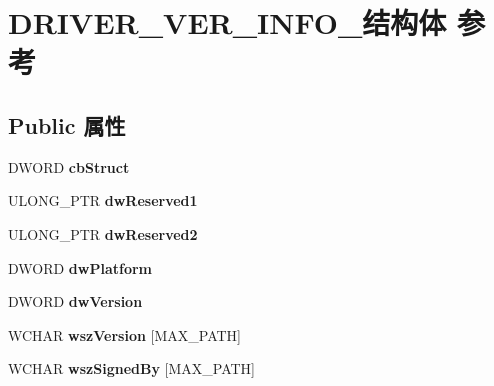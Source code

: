 \hypertarget{struct_d_r_i_v_e_r___v_e_r___i_n_f_o__}{}\section{D\+R\+I\+V\+E\+R\+\_\+\+V\+E\+R\+\_\+\+I\+N\+F\+O\+\_\+结构体 参考}
\label{struct_d_r_i_v_e_r___v_e_r___i_n_f_o__}
\subsection*{Public 属性}
\begin{DoxyCompactItemize}
\item 
\mbox{\label{struct_d_r_i_v_e_r___v_e_r___i_n_f_o___aa079c5b69594cfdfcebdfc1f5f7913ef}} 
D\+W\+O\+RD {\bfseries cb\+Struct}
\item 
\mbox{\label{struct_d_r_i_v_e_r___v_e_r___i_n_f_o___aeef7397969221ad24ec986f1e923f425}} 
U\+L\+O\+N\+G\+\_\+\+P\+TR {\bfseries dw\+Reserved1}
\item 
\mbox{\label{struct_d_r_i_v_e_r___v_e_r___i_n_f_o___ae4bb239cd33a9e55286fac3bfc927ced}} 
U\+L\+O\+N\+G\+\_\+\+P\+TR {\bfseries dw\+Reserved2}
\item 
\mbox{\label{struct_d_r_i_v_e_r___v_e_r___i_n_f_o___a36c6128f252b04102b562a3428f143df}} 
D\+W\+O\+RD {\bfseries dw\+Platform}
\item 
\mbox{\label{struct_d_r_i_v_e_r___v_e_r___i_n_f_o___a81900287ff21433bf01c8bf58786ca1c}} 
D\+W\+O\+RD {\bfseries dw\+Version}
\item 
\mbox{\label{struct_d_r_i_v_e_r___v_e_r___i_n_f_o___a6a3150c9206123850c368c2a79eea200}} 
W\+C\+H\+AR {\bfseries wsz\+Version} \mbox{[}M\+A\+X\+\_\+\+P\+A\+TH\mbox{]}
\item 
\mbox{\label{struct_d_r_i_v_e_r___v_e_r___i_n_f_o___a17538fa8832f72085c5a6b39ce93ca26}} 
W\+C\+H\+AR {\bfseries wsz\+Signed\+By} \mbox{[}M\+A\+X\+\_\+\+P\+A\+TH\mbox{]}

\end{DoxyCompactItemize}
